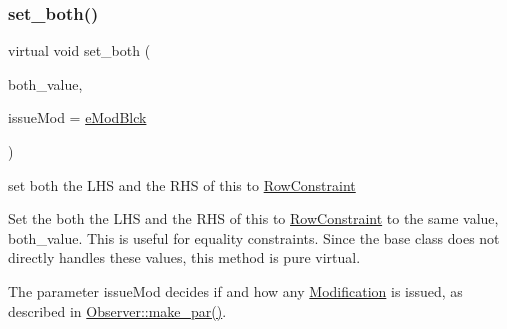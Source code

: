 \mbox{\label{class_s_m_spp__di__unipi__it_1_1_row_constraint_abe9589ef7ede6b4d5b0c0a1cbe72b5b7}} 
\subsubsection{\texorpdfstring{set\+\_\+both()}{set\_both()}}
{\footnotesize\ttfamily virtual void set\+\_\+both (\begin{DoxyParamCaption}\item[{\mbox{\hyperlink{class_s_m_spp__di__unipi__it_1_1_row_constraint_a34abd4b01d3a2024be5f6d13dd88779f}{c\+\_\+\+R\+H\+S\+Value}}}]{both\+\_\+value,  }\item[{\mbox{\hyperlink{group___modification___t_y_p_e_s_ga544246d8c462e9a2d817c2c30797968f}{c\+\_\+\+Mod\+Param}}}]{issue\+Mod = {\ttfamily \mbox{\hyperlink{group___modification___t_y_p_e_s_gga48fddcdd03a03f49b7e389ca1ed938d4a21b14b26b1c0093a0905f6fc010bad29}{e\+Mod\+Blck}}} }\end{DoxyParamCaption})\hspace{0.3cm}{\ttfamily [pure virtual]}}



set both the L\+HS and the R\+HS of this to \mbox{\hyperlink{class_s_m_spp__di__unipi__it_1_1_row_constraint}{Row\+Constraint}} 

Set the both the L\+HS and the R\+HS of this to \mbox{\hyperlink{class_s_m_spp__di__unipi__it_1_1_row_constraint}{Row\+Constraint}} to the same value, both\+\_\+value. This is useful for equality constraints. Since the base class does not directly handles these values, this method is pure virtual.

The parameter issue\+Mod decides if and how any \mbox{\hyperlink{class_s_m_spp__di__unipi__it_1_1_modification}{Modification}} is issued, as described in \mbox{\hyperlink{class_s_m_spp__di__unipi__it_1_1_observer_a2d499ae38e5e95cf66cd71da32b0694a}{Observer\+::make\+\_\+par()}}. 


